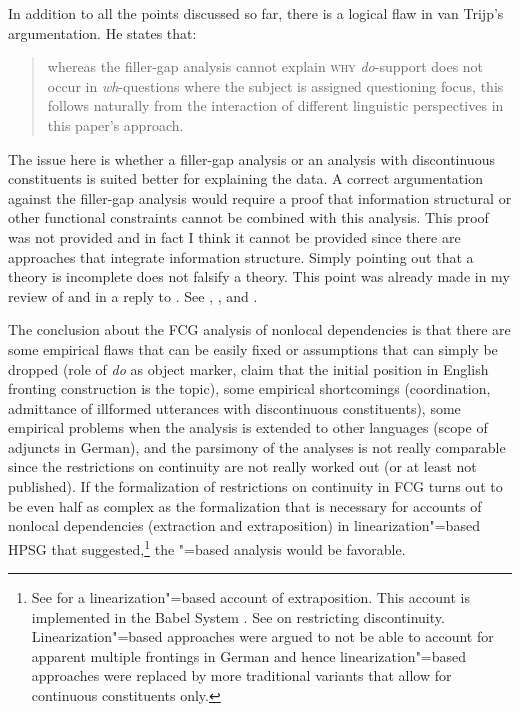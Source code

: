 In addition to all the points discussed so far, there is a logical flaw in van Trijp's argumentation.
He states that:
\begin{quote}
whereas the filler-gap analysis cannot explain \textsc{why} \emph{do}-support does not occur
  in \emph{wh}-questions where the subject is assigned questioning focus, this follows naturally
from the interaction of different linguistic perspectives in this paper's
approach. \citep[]{vanTrijp2014a}
\end{quote}
The issue here is whether a filler-gap analysis or an analysis with discontinuous
constituents is suited better for explaining the data. A correct argumentation against the filler-gap analysis would require a proof that information structural or other functional constraints
cannot be combined with this analysis. This proof was not provided and in fact I think it cannot be
provided since there are approaches that integrate information structure. Simply pointing out that a
theory is incomplete does not falsify a theory. This point was already made in my review of
 and in a reply to \citet{Boas2014a}. See ,
, and .

The conclusion about the FCG analysis of nonlocal dependencies is that there are some empirical
flaws that can be easily fixed or assumptions that can simply be dropped (role of \emph{do} as object marker, claim that
the initial position in English fronting construction is the topic), some empirical shortcomings
(coordination, admittance of illformed utterances with discontinuous constituents), some empirical
problems when the analysis is extended to other languages (scope of adjuncts in German), and the
parsimony of the analyses is not really comparable since the restrictions on continuity are not
really worked out (or at least not published). If the formalization of restrictions on continuity in FCG turns out to be even
half as complex as the formalization that is necessary for accounts of nonlocal dependencies
(extraction and extraposition) in linearization"=based HPSG that \citet{Reape2000a}
suggested,\footnote{%
  See  for a linearization"=based account of extraposition. This account is
  implemented in the Babel System \citep{Babel}. See \citep{Mueller99g} on restricting
  discontinuity. Linearization"=based approaches were argued to not be able to account for
  apparent multiple frontings in German \citep{Mueller2005d,MuellerGS} and hence
  linearization"=based approaches were replaced by more traditional variants that allow for
  continuous constituents only.
} the \slasch"=based analysis would be favorable.

